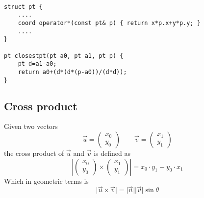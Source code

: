 \documentclass[12pt,t]{beamer}
\begin{document}
\begin{frame}[fragile]
  \vspace{20pt}
  \begin{verbatim}

struct pt {
    ....
    coord operator*(const pt& p) { return x*p.x+y*p.y; }
    ....
}

pt closestpt(pt a0, pt a1, pt p) {
    pt d=a1-a0;
    return a0+(d*(d*(p-a0))/(d*d));
}
  \end{verbatim}
\end{frame}
\subsection{Cross product}
\begin{frame}
  \vspace{20pt}
  Given two vectors
  \[
    \vec{u} = \begin{pmatrix} x_0 \\ y_0 \end{pmatrix} \quad\quad
    \vec{v} = \begin{pmatrix} x_1 \\ y_1 \end{pmatrix}
  \]
  the cross product of $\vec{u}$ and $\vec{v}$ is defined as 
  \[
    \left\lvert \begin{pmatrix} x_0 \\ y_0 \end{pmatrix} \times
    \begin{pmatrix} x_1 \\ y_1 \end{pmatrix}\right\rvert  = 
    x_0\cdot y_1 - y_0 \cdot x_1
  \]
  Which in geometric terms is
  \[
    \lvert \vec{u} \times \vec{v} \vert = 
    \lvert \vec{u} \rvert \lvert \vec{v} \rvert \sin \theta
  \]
\end{frame}
\end{document}
